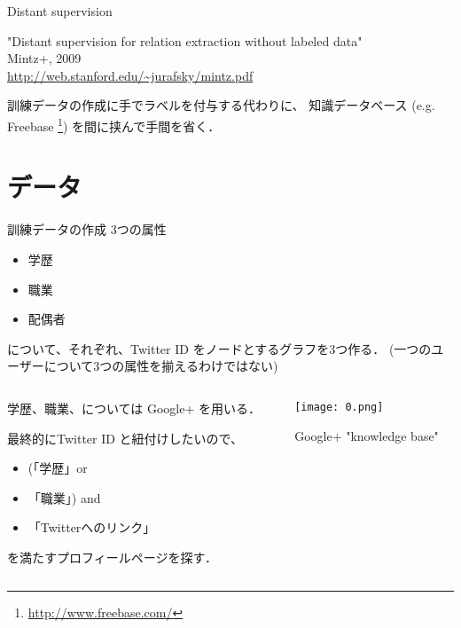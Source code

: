 \documentclass[12pt, dvipdfmx, default, cjk]{beamer}
\begin{document}
\begin{frame}{Distant supervision}

  "Distant supervision for relation extraction without labeled data" \\
  Mintz+, 2009 \\
  \url{http://web.stanford.edu/~jurafsky/mintz.pdf}

  \vfill

  訓練データの作成に手でラベルを付与する代わりに、
  知識データベース (e.g. Freebase \footnote[frame]{\url{http://www.freebase.com/}})
  を間に挟んで手間を省く．

\end{frame}

\section{データ}

\begin{frame}{訓練データの作成}
  3つの属性
  
  \begin{itemize}
    \item 学歴
    \item 職業
    \item 配偶者
  \end{itemize}
  
  について、それぞれ、Twitter ID をノードとするグラフを3つ作る．
  (一つのユーザーについて3つの属性を揃えるわけではない)
\end{frame}

\begin{frame}
\begin{columns}
 \begin{column}{0.5\textwidth}
   学歴、職業、については
   Google+ を用いる．

   最終的にTwitter ID と紐付けしたいので、
   \begin{itemize}
     \item (「学歴」or
     \item「職業」) and
     \item「Twitterへのリンク」
   \end{itemize}
   を満たすプロフィールページを探す．

 \end{column}
 \begin{column}{0.5\textwidth}
   \texttt{[image: 0.png]}

   Google+ "knowledge base"
 \end{column}
 \end{columns}
\end{frame}
\end{document}
